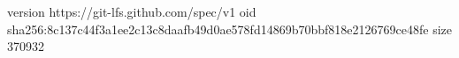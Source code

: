 version https://git-lfs.github.com/spec/v1
oid sha256:8c137c44f3a1ee2c13c8daafb49d0ae578fd14869b70bbf818e2126769ce48fe
size 370932
